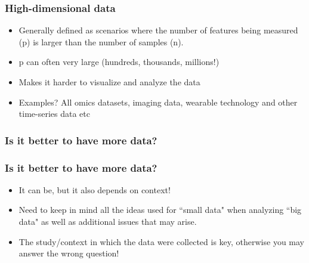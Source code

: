 \documentclass{beamer}
\begin{document}
\begin{frame}
\frametitle{High-dimensional data}

\begin{itemize}
\item Generally defined as scenarios where the number of features being measured (p) is larger than the number of samples (n).
\item p can often very large (hundreds, thousands, millions!)
\item Makes it harder to visualize and analyze the data
\item Examples? {\color{orange}All omics datasets, imaging data, wearable technology and other time-series data etc}

\end{itemize}

\end{frame}


\begin{frame}
\frametitle{Is it better to have more data?}

\end{frame}


\begin{frame}
\frametitle{Is it better to have more data?}

\begin{itemize}
\item It can be, but it also depends on context!
\item Need to keep in mind all the ideas used for ``small data" when analyzing ``big data" as well as additional
issues that may arise.
\item The study/context in which the data were collected is key, otherwise you may answer the wrong question!
\end{itemize}

\end{frame}

\end{document}

